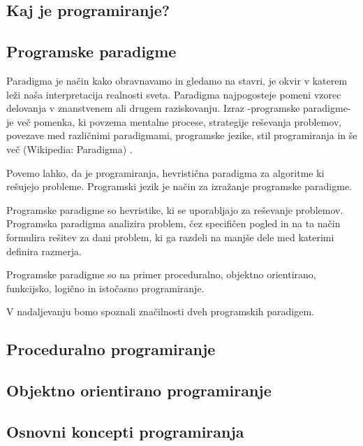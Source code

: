 \subsection{Kaj je programiranje?}
\label{sec:kaj_je_programiranje}


\subsection{Programske paradigme}
\label{sec:programske_paradigme}

Paradigma je način kako obravnavamo in gledamo na stavri, je okvir v
katerem leži naša interpretacija realnosti sveta. Paradigma
najpogosteje pomeni vzorec delovanja v znanstvenem ali drugem
raziskovanju.  Izraz -programske paradigme- je več pomenka, ki povzema
mentalne procese, strategije reševanja problemov, povezave med
različnimi paradigmami, programske jezike, stil programiranja in še
več (Wikipedia: Paradigma) \cite{guideTCS}.

Povemo lahko, da je programiranja, hevristična paradigma za algoritme
ki rešujejo probleme. Programski jezik je način za izražanje
programske paradigme.

Programske paradigme so hevristike, ki se uporabljajo za reševanje
problemov. Programska paradigma analizira problem, čez specifičen
pogled in na ta način formulira rešitev za dani problem, ki ga razdeli
na manjše dele med katerimi definira razmerja.

Programske paradigme so na primer proceduralno, objektno orientirano,
funkcijsko, logično in istočasno programiranje.

V nadaljevanju bomo spoznali značilnosti dveh programskih paradigem.

\subsection{Proceduralno programiranje}
\label{sec:proceduralno_programiranje}

\subsection{Objektno orientirano programiranje}
\label{sec:objektno_orijentirano_programiranje}

\subsection{Osnovni koncepti programiranja}
\label{sec:Osnvni koncepti_programiranja}

